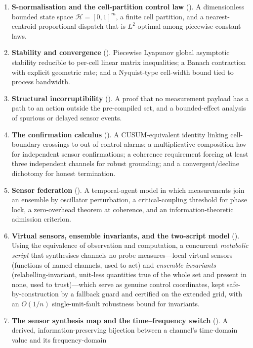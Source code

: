 \documentclass[11pt,a4paper,twocolumn]{article}
\theoremstyle{thmstyle}
\theoremstyle{definition}
\theoremstyle{remark}
\newcommand{\Hs}{\mathcal{H}}
\begin{document}
\begin{enumerate}[leftmargin=1.4em,itemsep=2pt]
\item \textbf{S-normalisation and the cell-partition control law}
(). A dimensionless bounded state space
$\Hs=[0,1]^m$, a finite cell partition, and a nearest-centroid
proportional dispatch that is $L^2$-optimal among piecewise-constant
laws.
\item \textbf{Stability and convergence} ().
Piecewise Lyapunov global asymptotic stability reducible to per-cell
linear matrix inequalities; a Banach contraction with explicit geometric
rate; and a Nyquist-type cell-width bound tied to process bandwidth.
\item \textbf{Structural incorruptibility} (). A proof
that no measurement payload has a path to an action outside the
pre-compiled set, and a bounded-effect analysis of spurious or delayed
sensor events.
\item \textbf{The confirmation calculus} (). A
CUSUM-equivalent identity linking cell-boundary crossings to
out-of-control alarms; a multiplicative composition law for independent
sensor confirmations; a coherence requirement forcing at least three
independent channels for robust grounding; and a
convergent/decline dichotomy for honest termination.
\item \textbf{Sensor federation} (). A temporal-agent
model in which measurements join an ensemble by oscillator perturbation,
a critical-coupling threshold for phase lock, a zero-overhead theorem at
coherence, and an information-theoretic admission criterion.
\item \textbf{Virtual sensors, ensemble invariants, and the two-script
model} (). Using the equivalence of observation and
computation, a concurrent \emph{metabolic script} that synthesises
channels no probe measures---local virtual sensors (functions of named
channels, used to act) and \emph{ensemble invariants} (relabelling-invariant,
unit-less quantities true of the whole set and present in none, used to
trust)---which serve as genuine control coordinates, kept
safe-by-construction by a fallback guard and certified on the extended
grid, with an $O(1/n)$ single-unit-fault robustness bound for invariants.
\item \textbf{The sensor synthesis map and the time--frequency switch}
(). A derived, information-preserving
bijection between a channel's time-domain value and its frequency-domain

\end{enumerate}
\end{document}
